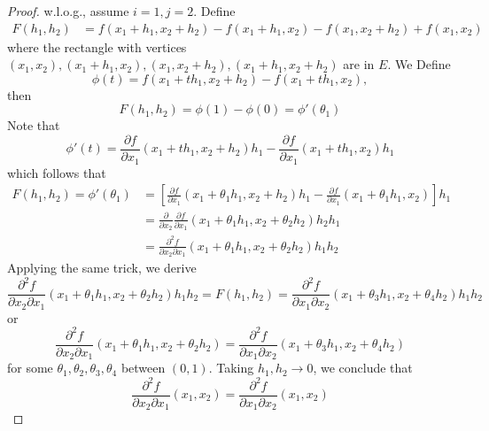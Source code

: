 \begin{proof}
w.l.o.g., assume $i=1,j=2$. Define
\begin{align*}
F(h_1,h_2) &= f(x_1+h_1,x_2+h_2) - f(x_1+h_1,x_2) - f(x_1,x_2+h_2)+f(x_1,x_2)
\end{align*}
where the rectangle with vertices $(x_1,x_2),(x_1+h_1,x_2),(x_1,x_2+h_2),(x_1+h_1,x_2+h_2)$ are in $E$. We Define
\[
\phi(t)=f(x_1+th_1,x_2+h_2) - f(x_1+th_1,x_2),
\]
then
\[
F(h_1,h_2) = \phi(1) - \phi(0)=\phi'(\theta_1)
\]
Note that
\[
\phi'(t) = \frac{\partial f}{\partial x_1}(x_1+th_1,x_2+h_2)h_1 - \frac{\partial f}{\partial x_1}(x_1+th_1,x_2)h_1
\]
which follows that
\begin{align*}
F(h_1,h_2)=\phi'(\theta_1)
&=
\left[\frac{\partial f}{\partial x_1}(x_1+\theta_1h_1,x_2+h_2)h_1 - \frac{\partial f}{\partial x_1}(x_1+\theta_1h_1,x_2)\right]h_1\\
&=\frac{\partial }{\partial x_2}\frac{\partial f}{\partial x_1}(x_1+\theta_1h_1,x_2+\theta_2h_2)h_2h_1\\
&=\frac{\partial^2f}{\partial x_2\partial x_1}(x_1+\theta_1h_1,x_2+\theta_2h_2)h_1h_2
\end{align*}
Applying the same trick, we derive 
\[
\frac{\partial^2f}{\partial x_2\partial x_1}(x_1+\theta_1h_1,x_2+\theta_2h_2)h_1h_2=F(h_1,h_2)
=
\frac{\partial^2f}{\partial x_1\partial x_2}(x_1+\theta_3h_1,x_2+\theta_4h_2)h_1h_2
\]
or
\[
\frac{\partial^2f}{\partial x_2\partial x_1}(x_1+\theta_1h_1,x_2+\theta_2h_2)
=
\frac{\partial^2f}{\partial x_1\partial x_2}(x_1+\theta_3h_1,x_2+\theta_4h_2)
\]
for some $\theta_1,\theta_2,\theta_3,\theta_4$ between $(0,1)$. Taking $h_1,h_2\to0$, we conclude that
\[
\frac{\partial^2f}{\partial x_2\partial x_1}(x_1,x_2) = \frac{\partial^2f}{\partial x_1\partial x_2}(x_1,x_2)
\]


\end{proof}


